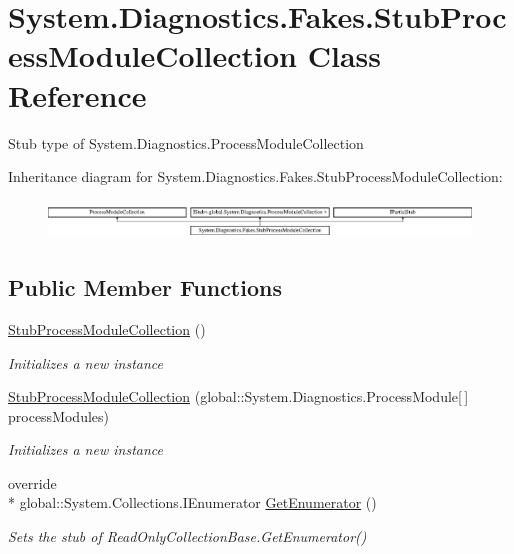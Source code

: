 \hypertarget{class_system_1_1_diagnostics_1_1_fakes_1_1_stub_process_module_collection}{\section{System.\-Diagnostics.\-Fakes.\-Stub\-Process\-Module\-Collection Class Reference}
\label{class_system_1_1_diagnostics_1_1_fakes_1_1_stub_process_module_collection}
}


Stub type of System.\-Diagnostics.\-Process\-Module\-Collection 


Inheritance diagram for System.\-Diagnostics.\-Fakes.\-Stub\-Process\-Module\-Collection\-:\begin{figure}[H]
\begin{center}
\leavevmode
\includegraphics[height=1.017257cm]{class_system_1_1_diagnostics_1_1_fakes_1_1_stub_process_module_collection}
\end{center}
\end{figure}
\subsection*{Public Member Functions}
\begin{DoxyCompactItemize}
\item 
\hyperlink{class_system_1_1_diagnostics_1_1_fakes_1_1_stub_process_module_collection_a60172b63add023fa2c838820371f6312}{Stub\-Process\-Module\-Collection} ()
\begin{DoxyCompactList}\small\item\em Initializes a new instance\end{DoxyCompactList}\item 
\hyperlink{class_system_1_1_diagnostics_1_1_fakes_1_1_stub_process_module_collection_aa5041ae00ca539528f07fc044bf184db}{Stub\-Process\-Module\-Collection} (global\-::\-System.\-Diagnostics.\-Process\-Module\mbox{[}$\,$\mbox{]} process\-Modules)
\begin{DoxyCompactList}\small\item\em Initializes a new instance\end{DoxyCompactList}\item 
override \\*
global\-::\-System.\-Collections.\-I\-Enumerator \hyperlink{class_system_1_1_diagnostics_1_1_fakes_1_1_stub_process_module_collection_a4ac084b24626787eaa28aefce8cc9a1e}{Get\-Enumerator} ()
\begin{DoxyCompactList}\small\item\em Sets the stub of Read\-Only\-Collection\-Base.\-Get\-Enumerator()\end{DoxyCompactList}\end{DoxyCompactItemize}
